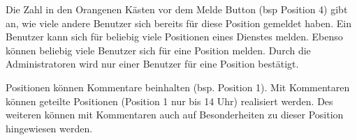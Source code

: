 \noindent Die Zahl in den Orangenen Kästen vor dem Melde Button (bsp Position 4) gibt an, wie viele andere Benutzer sich bereits für diese Position gemeldet haben. Ein Benutzer kann sich für beliebig viele Positionen eines Dienstes melden. Ebenso können beliebig viele Benutzer sich für eine Position melden. Durch die Administratoren wird nur einer Benutzer für eine Position bestätigt.

\noindent Positionen können Kommentare beinhalten (bsp. Position 1). Mit Kommentaren können geteilte Positionen (Position 1 nur bis 14 Uhr) realisiert werden. Des weiteren können mit Kommentaren auch auf Besonderheiten zu dieser Position hingewiesen werden.